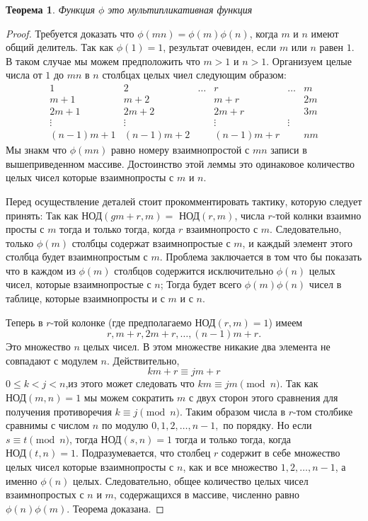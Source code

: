 \documentclass[11pt]{article}
\newtheorem{theorem}{Теорема}
\begin{document}
\begin{theorem}
	Функция $\phi$ это мультипликативная функция
\end{theorem}
\begin{proof}
	Требуется доказать что $\phi (mn)=\phi (m) \phi(n)$, когда $m$ и $n$ имеют общий делитель. Так как $\phi(1)=1$, результат очевиден, если $m$ или $n$ равен $1$. В таком случае мы можем предположить что $m>1$ и $n>1$. Организуем целые числа от $1$ до $mn$ в $n$ столбцах целых чиел следующим образом:
	\[
	\begin{matrix}
	1 & 2 & \ldots & r & \ldots & m \\
	m+1 & m+2 &  & m+r& & 2m\\
	2m+1 & 2m+2 &  & 2m+r& & 3m\\
	\vdots&\vdots& &\vdots&\vdots\\
	(n-1)m+1 & (n-1)m+2 &  & (n-1)m+r& & nm
	\end{matrix}
	\]
	Мы знакм что $\phi(mn)$ равно номеру взаимнопростой с $mn$ записи в вышеприведенном массиве. Достоинство этой леммы это одинаковое количество целых чисел которые взаимнопросты с $m$ и $n$.
	
	Перед осуществление деталей стоит прокомментировать тактику, которую следует принять: Так как  $\text{НОД}(gm+r,m)=$ $\text{НОД}(r,m)$, числа $r$-той колнки взаимно просты с $m$ тогда и только тогда, когда $r$ взаимнопросто с $m$. Следовательно, только $\phi(m)$ столбцы содержат взаимнопростые с $m$, и каждый элемент этого столбца будет взаимнопростым с $m$. Проблема заключается в том что бы показать что в каждом из $\phi(m)$ столбцов содержится исключительно $\phi(n)$ целых чисел, которые взаимнопростые с $n$; Тогда будет всего $\phi(m) \phi(n)$ чисел в таблице, которые взаимнопросты и с $m$  и с $n$.
	
	Теперь в $r$-той колонке (где предполагаемо  $\text{НОД}(r,m)=1$) имеем
	\[
	r, m+r,2m+r,\ldots,(n-1)m+r.
	\]
	Это множество $n$ целых чисел. В этом множестве никакие два элемента не совпадают с модулем $n$. Действительно,
	\[km+r \equiv jm+r
	\]
	$0\leq k<j<n$,из этого может следовать что $km\equiv jm  \pmod{n}$. Так как  $\text{НОД}(m,n)=1$ мы можем сократить $m$ с двух сторон этого сравнения для получения противоречия $k \equiv j \pmod{n}$. Таким образом числа в $r$-том столбике сравнимы с числом $n$ по модулю $0,1,2,\ldots,n-1,$ по порядку. Но если $s \equiv t \pmod {n}$, тогда  $\text{НОД}(s,n)=1$ тогда и только тогда, когда  $\text{НОД}(t,n)=1$. Подразумевается, что столбец $r$ содержит в себе множество целых чисел которые взаимнопросты с $n$, как и все множество ${1,2,\ldots,n-1}$, а именно $\phi(n)$ целых. Следовательно, общее количество целых чисел взаимнопростых с $n$ и $m$, содержащихся в массиве, численно равно $\phi(n) \phi(m)$. Теорема доказана.
\end{proof}
\end{document}
